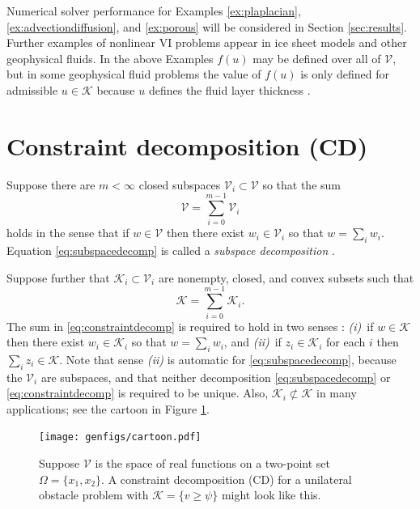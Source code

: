 \documentclass[letterpaper,final,12pt,reqno]{amsart}
\theoremstyle{cstyle}
\theoremstyle{cstyle*}
\theoremstyle{dstyle}
\numberwithin{equation}{section}
\numberwithin{figure}{section}
\numberwithin{table}{section}
\numberwithin{theorem}{section}
\newcommand{\cK}{\mathcal{K}}
\newcommand{\cV}{\mathcal{V}}
\begin{document}
Numerical solver performance for Examples \ref{ex:plaplacian}, \ref{ex:advectiondiffusion}, and \ref{ex:porous} will be considered in Section \ref{sec:results}.  Further examples of nonlinear VI problems appear in ice sheet models \cite{Calvoetal2002,JouvetBueler2012} and other geophysical fluids.  In the above Examples $f(u)$ may be defined over all of $\mathcal{V}$, but in some geophysical fluid problems the value of $f(u)$ is only defined for admissible $u\in \mathcal{K}$ because $u$ defines the fluid layer thickness \cite{Bueler2021conservation}.


\section{Constraint decomposition (CD)} \label{sec:cd}

Suppose there are $m<\infty$ closed subspaces $\cV_i \subset \cV$ so that the sum
\begin{equation}
\cV = \sum_{i=0}^{m-1} \cV_i \label{eq:subspacedecomp}
\end{equation}
holds in the sense that if $w \in \cV$ then there exist $w_i \in \cV_i$ so that $w = \sum_i w_i$.  Equation \eqref{eq:subspacedecomp} is called a \emph{subspace decomposition} \cite{Xu1992}.

Suppose further that $\cK_i \subset \cV_i$ are nonempty, closed, and convex subsets such that
\begin{equation}
\cK = \sum_{i=0}^{m-1} \cK_i. \label{eq:constraintdecomp}
\end{equation}
The sum in \eqref{eq:constraintdecomp} is required to hold in two senses \cite{TaiTseng2002}: \emph{(i)}~if $w \in \cK$ then there exist $w_i \in \cK_i$ so that $w = \sum_i w_i$, and \emph{(ii)}~if $z_i \in \cK_i$ for each $i$ then $\sum_i z_i \in \cK$.  Note that sense \emph{(ii)} is automatic for \eqref{eq:subspacedecomp}, because the $\cV_i$ are subspaces, and that neither decomposition \eqref{eq:subspacedecomp} or \eqref{eq:constraintdecomp} is required to be unique.  Also, $\cK_i \not\subset \cK$ in many applications; see the cartoon in Figure \ref{fig:cartoon}.

\begin{figure}[ht]
\texttt{[image: genfigs/cartoon.pdf]}
\caption{Suppose $\mathcal{V}$ is the space of real functions on a two-point set $\Omega=\{x_1,x_2\}$.  A constraint decomposition (CD) for a unilateral obstacle problem with $\mathcal{K}=\{v\ge \psi\}$ might look like this.}
\label{fig:cartoon}
\end{figure}
\end{document}
